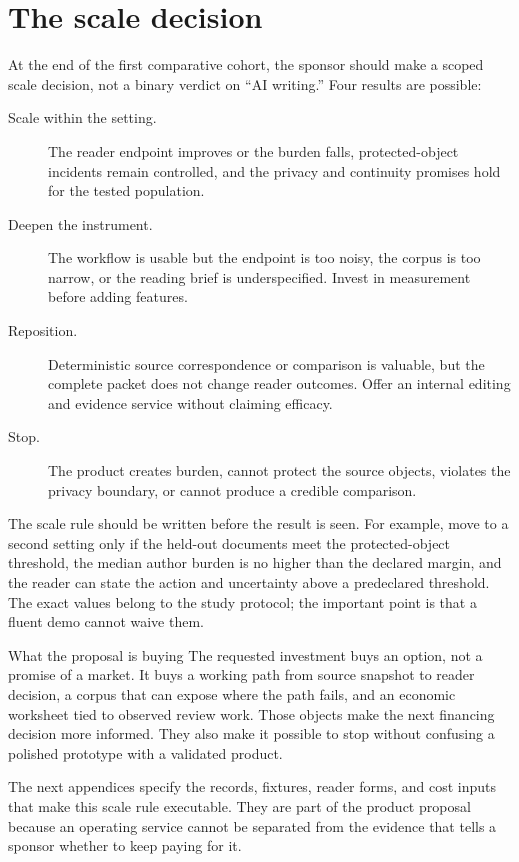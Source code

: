 \section{The scale decision}
\label{sec:adoption-scale-decision}

At the end of the first comparative cohort, the sponsor should make a scoped
scale decision, not a binary verdict on ``AI writing.'' Four results are
possible:

\begin{description}
\item[Scale within the setting.] The reader endpoint improves or the burden
  falls, protected-object incidents remain controlled, and the privacy and
  continuity promises hold for the tested population.
\item[Deepen the instrument.] The workflow is usable but the endpoint is too
  noisy, the corpus is too narrow, or the reading brief is underspecified.
  Invest in measurement before adding features.
\item[Reposition.] Deterministic source correspondence or comparison is
  valuable, but the complete packet does not change reader outcomes. Offer an
  internal editing and evidence service without claiming efficacy.
\item[Stop.] The product creates burden, cannot protect the source objects,
  violates the privacy boundary, or cannot produce a credible comparison.
\end{description}

The scale rule should be written before the result is seen. For example, move
to a second setting only if the held-out documents meet the protected-object
threshold, the median author burden is no higher than the declared margin,
and the reader can state the action and uncertainty above a predeclared
threshold. The exact values belong to the study protocol; the important point
is that a fluent demo cannot waive them.

\begin{plainbox}{What the proposal is buying}
The requested investment buys an option, not a promise of a market. It buys a
working path from source snapshot to reader decision, a corpus that can expose
where the path fails, and an economic worksheet tied to observed review work.
Those objects make the next financing decision more informed. They also make
it possible to stop without confusing a polished prototype with a validated
product.
\end{plainbox}

The next appendices specify the records, fixtures, reader forms, and cost
inputs that make this scale rule executable. They are part of the product
proposal because an operating service cannot be separated from the evidence
that tells a sponsor whether to keep paying for it.
